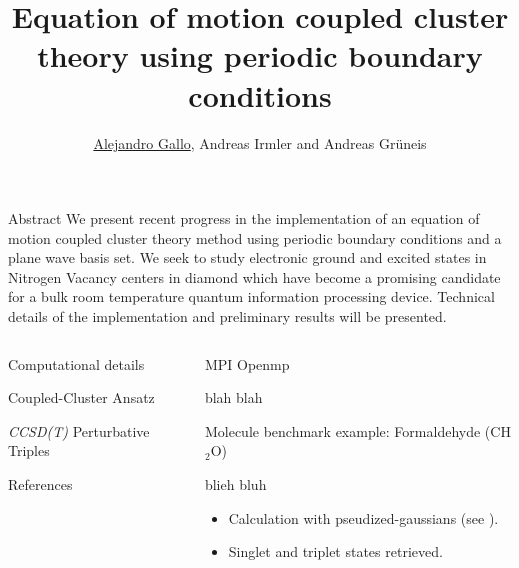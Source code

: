 \documentclass[final]{beamer}
\title{
  Equation of motion coupled cluster theory using periodic boundary conditions
}
\author{\underline{Alejandro Gallo}, Andreas Irmler and Andreas Gr\"uneis}
\institute[]{
  Technical University of Vienna
}
\begin{document}
\nocite{*}
\begin{frame}[fragile]{}

  \begin{block}{\large Abstract}
    We present recent progress in the implementation of an equation of motion
    coupled cluster theory method using periodic boundary conditions and a plane
    wave basis set.  We seek to study electronic ground and excited states in
    Nitrogen Vacancy centers in diamond which have become a promising candidate
    for a bulk room temperature quantum information processing device. Technical
    details of the implementation and preliminary results will be presented.
  \end{block}
  \begin{columns}[t]
    \begin{column}{.49\linewidth}
      \begin{block}{\large Computational details}
        
      \end{block}
      \begin{block}{\large Coupled-Cluster Ansatz}
        
      \end{block}
      \begin{block}{\large \emph{CCSD(T)} Perturbative Triples}
        
      \end{block}

      \begin{block}{\large References}
        \printbibliography
      \end{block}

    \end{column}


    \begin{column}{.49\linewidth}
      \begin{block}{\large MPI Openmp}
        \begin{center}

          blah blah

        \end{center}
      \end{block}

      \begin{block}{\large Molecule benchmark example: Formaldehyde (CH$_2$O)}

        blieh bluh

        \begin{itemize}
          \item
            Calculation with pseudized-gaussians
            (see \cite{10.10631.4961301}).
          \item
            Singlet and triplet states retrieved.
        \end{itemize}
      \end{block}


\end{column}
\end{columns}
\end{frame}
\end{document}
